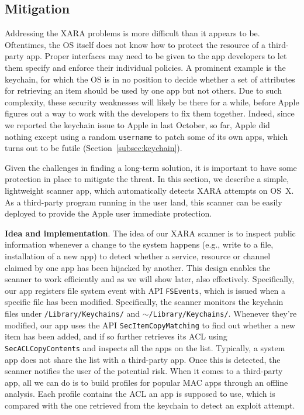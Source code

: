 \documentclass{article}
\newcommand{\ignore}[1]{}
\begin{document}
\vspace {-5pt}
\subsection{Mitigation}
\label{subsec:defense}


Addressing the XARA problems is more difficult than it appears to be.\ignore{Changes may need to be made to the Apple access control framework to enforce the policies such as which NSConnection client is allowed to get the object from a specific server. Further complicating the situation is the fact that} Oftentimes, the OS itself does not know how to protect the resource of a third-party app.  Proper interfaces may need to be given to the app developers to let them specify and enforce their individual policies. A prominent example is the keychain, for which the OS is in no position to decide whether a set of attributes for retrieving an item should be used by one app but not others. Due to such complexity, these security weaknesses will likely be there for a while, before Apple figures out a way to work with the developers to fix them together. Indeed, since we reported the keychain issue to Apple in last October, so far, Apple did nothing except using a random \texttt{username} to patch some of its own apps, which turns out to be futile (Section~\ref{subsec:keychain}).

Given the challenges in finding a long-term solution\ignore{ for these problems}, it is important to have some protection in place to mitigate the threat\ignore{, informing Apple users whenever the security risks show up}. In this section, we describe a simple, lightweight scanner app, which automatically detects XARA attempts on OS~X.  As a third-party program running in the user land, this scanner can be easily deployed to provide the Apple user immediate protection.


\vspace {3pt}\noindent\textbf{Idea and implementation}. The idea of our XARA scanner is to inspect public information whenever a change to the system happens (e.g., write to a file, installation of a new app) to detect whether a service, resource or channel claimed by one app has been hijacked by another. This design enables the scanner to work efficiently and as we will show later, also effectively.  Specifically, our app registers file system event with API \texttt{FSEvents}, which is issued when a specific file has been modified. Specifically, the scanner monitors the keychain files under \texttt{/Library/Keychains/} and \texttt{$\sim$/Library/Keychains/}. Whenever they're modified, our app uses the API \texttt{SecItemCopyMatching} to find out whether a new item has been added, and if so further retrieves its ACL using \texttt{SecACLCopyContents} and inspects all the apps on the list. Typically, a system app does not share the list with a third-party app.  Once this is detected, the scanner notifies the user of the potential risk\ignore{ and suggests the protection measure that can be taken}. When it comes to a third-party app, all we can do is to build profiles for popular MAC apps through an offline analysis. Each profile contains the ACL an app is supposed to use, which is compared with the one retrieved from the keychain to detect an exploit attempt.
\end{document}
